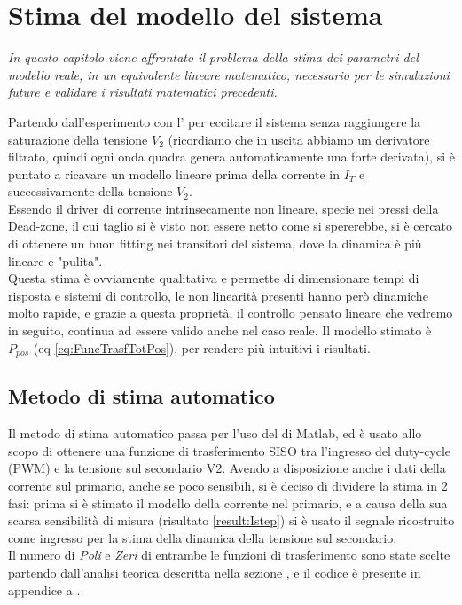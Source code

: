 \chapter{Stima del modello del sistema}\label{cap:stimaModello}

\begin{minipage}{12cm}\textit{
		In questo capitolo viene affrontato il problema della stima dei parametri del modello reale, in un equivalente lineare matematico, necessario per le simulazioni future e validare i risultati matematici precedenti.}
\end{minipage}

\vspace*{1cm}
\noindent
Partendo dall'esperimento con l' per eccitare il sistema senza raggiungere la saturazione della tensione $ V_2 $ (ricordiamo che in uscita abbiamo un derivatore filtrato, quindi ogni onda quadra genera automaticamente una forte derivata), si è puntato a ricavare un modello lineare prima della corrente in $ I_T $ e successivamente della tensione $ V_2 $.\\
Essendo il driver di corrente intrinsecamente non lineare, specie nei pressi della Dead-zone, il cui taglio si è visto non essere netto come si spererebbe, si è cercato di ottenere un buon fitting nei transitori del sistema, dove la dinamica è più lineare e "pulita".\\
Questa stima è ovviamente qualitativa e permette di dimensionare tempi di risposta e sistemi di controllo, le non linearità presenti hanno però dinamiche molto rapide, e grazie a questa proprietà, il controllo pensato lineare che vedremo in seguito, continua ad essere valido anche nel caso reale.
Il modello stimato è $ P_{pos} $ (eq \ref{eq:FuncTrasfTotPos}), per rendere più intuitivi i risultati.

\newpage

\section{Metodo di stima automatico}
Il metodo di stima automatico passa per l'uso del \cite*{IdentificationToolbox} di Matlab, ed è usato allo scopo di ottenere una funzione di trasferimento SISO tra l'ingresso del duty-cycle (PWM) e la tensione sul secondario V2. Avendo a disposizione anche i dati della corrente sul primario, anche se poco sensibili, si è deciso di dividere la stima in 2 fasi: prima si è stimato il modello della corrente nel primario, e a causa della sua scarsa sensibilità di misura (risultato \ref{result:Istep}) si è usato il segnale ricostruito come ingresso per la stima della dinamica della tensione sul secondario.\\
Il numero di \textit{Poli} e \textit{Zeri} di entrambe le funzioni di trasferimento sono state scelte partendo dall'analisi teorica descritta nella sezione , e il codice è presente in appendice a .

